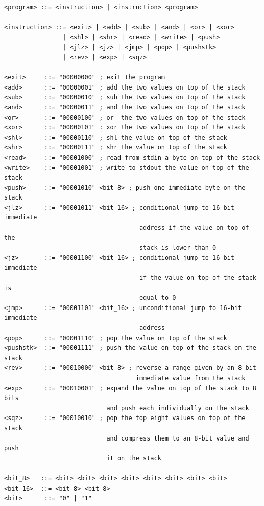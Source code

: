 \begin{lstlisting}[label={lst:vmwhere_bnf}, caption={BNF Grammar of the vmwhere bytecode syntax.}]
<program> ::= <instruction> | <instruction> <program>

<instruction> ::= <exit> | <add> | <sub> | <and> | <or> | <xor> 
                | <shl> | <shr> | <read> | <write> | <push> 
                | <jlz> | <jz> | <jmp> | <pop> | <pushstk> 
                | <rev> | <exp> | <sqz>

<exit>     ::= "00000000" ; exit the program
<add>      ::= "00000001" ; add the two values on top of the stack
<sub>      ::= "00000010" ; sub the two values on top of the stack
<and>      ::= "00000011" ; and the two values on top of the stack
<or>       ::= "00000100" ; or  the two values on top of the stack
<xor>      ::= "00000101" : xor the two values on top of the stack
<shl>      ::= "00000110" ; shl the value on top of the stack
<shr>      ::= "00000111" ; shr the value on top of the stack
<read>     ::= "00001000" ; read from stdin a byte on top of the stack
<write>    ::= "00001001" ; write to stdout the value on top of the stack
<push>     ::= "00001010" <bit_8> ; push one immediate byte on the stack
<jlz>      ::= "00001011" <bit_16> ; conditional jump to 16-bit immediate
                                     address if the value on top of the 
                                     stack is lower than 0
<jz>       ::= "00001100" <bit_16> ; conditional jump to 16-bit immediate
                                     if the value on top of the stack is
                                     equal to 0
<jmp>      ::= "00001101" <bit_16> ; unconditional jump to 16-bit immediate
                                     address
<pop>      ::= "00001110" ; pop the value on top of the stack
<pushstk>  ::= "00001111" ; push the value on top of the stack on the stack
<rev>      ::= "00010000" <bit_8> ; reverse a range given by an 8-bit
                                    immediate value from the stack
<exp>      ::= "00010001" ; expand the value on top of the stack to 8 bits
                            and push each individually on the stack
<sqz>      ::= "00010010" ; pop the top eight values on top of the stack
                            and compress them to an 8-bit value and push
                            it on the stack

<bit_8>   ::= <bit> <bit> <bit> <bit> <bit> <bit> <bit> <bit>
<bit_16>  ::= <bit_8> <bit_8>
<bit>      ::= "0" | "1"
\end{lstlisting}

